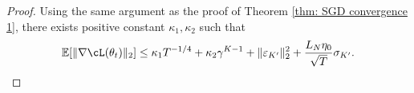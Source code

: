 \documentclass{article}
\begin{document}
\begin{proof}
    Using the same argument as the proof of Theorem \ref{thm: SGD convergence 1}, there exists positive constant $\kappa_1, \kappa_2$ such that
    \begin{align*}
        \mathbb{E} [\|\nabla \cL(\theta_t) \|_2] \leq \kappa_1 T^{-1/4} +  \kappa_2 \gamma^{K-1} + \| \varepsilon_{K'} \|^2_2 + \frac{L_N \eta_0}{\sqrt{T}} \sigma_{K'}.
    \end{align*}
\end{proof}
\end{document}
